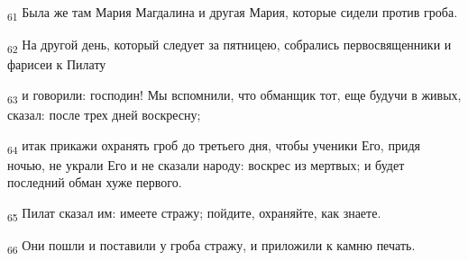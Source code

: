 \begin{tcolorbox}
\textsubscript{61} Была же там Мария Магдалина и другая Мария, которые сидели против гроба.
\end{tcolorbox}
\begin{tcolorbox}
\textsubscript{62} На другой день, который следует за пятницею, собрались первосвященники и фарисеи к Пилату
\end{tcolorbox}
\begin{tcolorbox}
\textsubscript{63} и говорили: господин! Мы вспомнили, что обманщик тот, еще будучи в живых, сказал: после трех дней воскресну;
\end{tcolorbox}
\begin{tcolorbox}
\textsubscript{64} итак прикажи охранять гроб до третьего дня, чтобы ученики Его, придя ночью, не украли Его и не сказали народу: воскрес из мертвых; и будет последний обман хуже первого.
\end{tcolorbox}
\begin{tcolorbox}
\textsubscript{65} Пилат сказал им: имеете стражу; пойдите, охраняйте, как знаете.
\end{tcolorbox}
\begin{tcolorbox}
\textsubscript{66} Они пошли и поставили у гроба стражу, и приложили к камню печать.
\end{tcolorbox}
